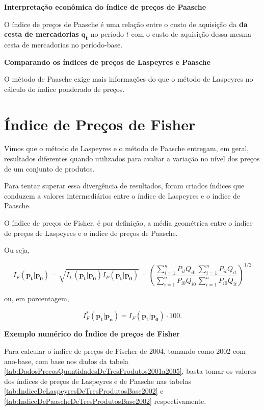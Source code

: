 \documentclass[
]{book}
\begin{document}
\textbf{Interpretação econômica do índice de preços de Paasche}

O índice de preços de Paasche é uma relação entre o custo de aquisição da \textbf{da cesta de mercadorias} \(\mathbf{q_t}\) no período \(t\) com o custo de aquisição dessa mesma
cesta de mercadorias no período-base.

\textbf{Comparando os índices de preços de Laspeyres e Paasche}

O método de Paasche exige mais informações do que o método de Laspeyres no cálculo
do índice ponderado de preços.

\hypertarget{uxedndice-de-preuxe7os-de-fisher}{%
\section{Índice de Preços de Fisher}\label{uxedndice-de-preuxe7os-de-fisher}}

Vimos que o método de Laspeyres e o método de Paasche entregam, em geral, resultados
diferentes quando utilizados para avaliar a variação no nível dos preços de um conjunto
de produtos.

Para tentar superar essa divergência de resultados, foram criados índices que conduzem
a valores intermediários entre o índice de Laspeyres e o índice de Paasche.

O índice de preços de Fisher, é por definição, a média geométrica entre o índice de
preços de Laspeyres e o índice de preços de Paasche.

Ou seja,

\begin{equation}
  I_F(\mathbf{p_t}| \mathbf{p_0}) = \sqrt{I_L(\mathbf{p_t}| \mathbf{p_0}) I_P(\mathbf{p_t}| \mathbf{p_0})}=  \left( \frac{\sum_{i=1}^{n}P_{it}Q_{i0}}{\sum_{i=1}^{n}P_{i0}Q_{i0}} \frac{\sum_{i=1}^{n}P_{it}Q_{it}}{\sum_{i=1}^{n}P_{i0}Q_{it}}\right)^{1/2}
  \label{eq:IndicePrecosFischer}
\end{equation}

ou, em porcentagem,

\begin{equation}
  I_F^*(\mathbf{p_t}|\mathbf{p_{o}}) = I_F(\mathbf{p_t}| \mathbf{p_0}) \cdot 100.
  \label{eq:IndicePrecosFischerEmPorcentagem}
\end{equation}

\textbf{Exemplo numérico do Índice de preços de Fisher}

Para calcular o índice de preços de Fischer de 2004, tomando como 2002 com ano-base, com base nos dados da tabela \ref{tab:DadosPrecosQuantidadesDeTresProdutos2001a2005}, basta tomar os valores dos índices de preços de Laspeyres e de Paasche nas tabelas \ref{tab:IndiceDeLaspeyresDeTresProdutosBase2002} e \ref{tab:IndiceDePaascheDeTresProdutosBase2002} respectivamente.
\end{document}
